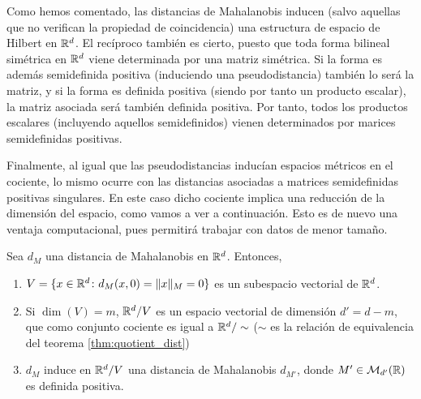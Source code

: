 Como hemos comentado, las distancias de Mahalanobis inducen (salvo aquellas que no verifican la propiedad de coincidencia) una estructura de espacio de Hilbert en $\mathbb{R}^d$. El recíproco también es cierto, puesto que toda forma bilineal simétrica en $\mathbb{R}^d$ viene determinada por una matriz simétrica. Si la forma es además semidefinida positiva (induciendo una pseudodistancia) también lo será la matriz, y si la forma es definida positiva (siendo por tanto un producto escalar), la matriz asociada será también definida positiva. Por tanto, todos los productos escalares (incluyendo aquellos semidefinidos) vienen determinados por marices semidefinidas positivas.

Finalmente, al igual que las pseudodistancias inducían espacios métricos en el cociente, lo mismo ocurre con las distancias asociadas a matrices semidefinidas positivas singulares. En este caso dicho cociente implica una reducción de la dimensión del espacio, como vamos a ver a continuación. Esto es de nuevo una ventaja computacional, pues permitirá trabajar con datos de menor tamaño.

\begin{prop} \label{prop:mahalanobis_lowrank}
    Sea $d_M$ una distancia de Mahalanobis en $\mathbb{R}^d$. Entonces,
    \begin{enumerate}
        \item $V = \{x \in \mathbb{R}^d \colon d_M(x,0) = \|x\|_M = 0 \}$ es un subespacio vectorial de $\mathbb{R}^d$.
        \item Si $\dim(V) = m$, $\mathbb{R}^d / V$ es un espacio vectorial de dimensión $d' = d - m$, que como conjunto cociente es igual a $\mathbb{R}^d/\sim$ ($\sim$ es la relación de equivalencia del teorema \ref{thm:quotient_dist})
        \item $d_M$ induce en $\mathbb{R}^d / V$ una distancia de Mahalanobis $d_{M'}$, donde $M' \in \mathcal{M}_{d'}(\mathbb{R})$ es definida positiva.
    \end{enumerate}
\end{prop}

